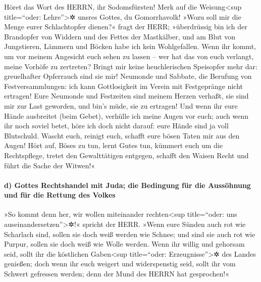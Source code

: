 Höret das Wort des HERRN, ihr Sodomsfürsten! Merk auf die
Weisung\textless sup title=``oder: Lehre''\textgreater✲ unsres Gottes,
du Gomorrhavolk! »Wozu soll mir die Menge eurer
Schlachtopfer dienen?« fragt der HERR; »überdrüssig bin ich der
Brandopfer von Widdern und des Fettes der Mastkälber, und am Blut von
Jungstieren, Lämmern und Böcken habe ich kein Wohlgefallen.
Wenn ihr kommt, um vor meinem Angesicht euch sehen zu
lassen -- wer hat das von euch verlangt, meine Vorhöfe zu zertreten?
Bringt mir keine heuchlerischen Speisopfer mehr dar:
greuelhafter Opferrauch sind sie mir! Neumonde und Sabbate, die Berufung
von Festversammlungen: ich kann Gottlosigkeit im Verein mit Festgepränge
nicht ertragen! Eure Neumonde und Festzeiten sind meinem
Herzen verhaßt, sie sind mir zur Last geworden, und bin's müde, sie zu
ertragen! Und wenn ihr eure Hände ausbreitet (beim
Gebet), verhülle ich meine Augen vor euch; auch wenn ihr noch soviel
betet, höre ich doch nicht darauf: eure Hände sind ja voll Blutschuld.
Wascht euch, reinigt euch, schafft eure bösen Taten mir
aus den Augen! Hört auf, Böses zu tun, lernt Gutes tun,
kümmert euch um die Rechtspflege, tretet den Gewalttätigen entgegen,
schafft den Waisen Recht und führt die Sache der Witwen!«

\hypertarget{d-gottes-rechtshandel-mit-juda-die-bedingung-fuxfcr-die-aussuxf6hnung-und-fuxfcr-die-rettung-des-volkes}{%
\paragraph{d) Gottes Rechtshandel mit Juda; die Bedingung für die
Aussöhnung und für die Rettung des
Volkes}\label{d-gottes-rechtshandel-mit-juda-die-bedingung-fuxfcr-die-aussuxf6hnung-und-fuxfcr-die-rettung-des-volkes}}

»So kommt denn her, wir wollen miteinander
rechten\textless sup title=``oder: uns
auseinandersetzen''\textgreater✲!« spricht der HERR. »Wenn eure Sünden
auch rot wie Scharlach sind, sollen sie doch weiß werden wie Schnee; und
sind sie auch rot wie Purpur, sollen sie doch weiß wie Wolle werden.
Wenn ihr willig und gehorsam seid, sollt ihr die
köstlichen Gaben\textless sup title=``oder: Erzeugnisse''\textgreater✲
des Landes genießen; doch wenn ihr euch weigert und
widerspenstig seid, sollt ihr vom Schwert gefressen werden; denn der
Mund des HERRN hat gesprochen!«

